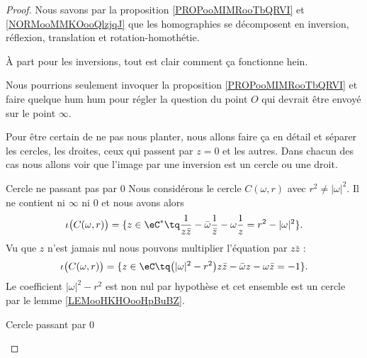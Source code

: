 \begin{proof}
    Nous savons par la proposition \ref{PROPooMIMRooTbQRVI} et \ref{NORMooMMKOooQlzjqJ} que les homographies se décomposent en inversion, réflexion, translation et rotation-homothétie.

    À part pour les inversions, tout est clair comment ça fonctionne hein. 

    Nous pourrions seulement invoquer la proposition \ref{PROPooMIMRooTbQRVI} et faire quelque hum hum pour régler la question du point \( O\) qui devrait être envoyé sur le point \( \infty\).

    Pour être certain de ne pas nous planter, nous allons faire ça en détail et séparer les cercles, les droites, ceux qui passent par \( z=0\) et les autres. Dans chacun des cas nous allons voir que l'image par une inversion est un cercle ou une droit.

    \begin{subproof}
        \item[Cercle ne passant pas par \( 0\)]
            Nous considérons le cercle \( C(\omega,r)\) avec \( r^2\neq | \omega |^2\). Il ne contient ni \( \infty\) ni \( 0\) et nous avons alors
            \begin{equation}
                \iota\big( C(\omega,r) \big)=\{ z\in \eC^*\tq \frac{1}{ z\bar z }-\bar\omega\frac{1}{ \bar z }-\omega\frac{1}{ z }=r^2-| \omega |^2 \}.
            \end{equation}
            Vu que \( z\) n'est jamais nul nous pouvons multiplier l'équation par \( z\bar z\) :
            \begin{equation}
                \iota\big( C(\omega,r) \big)=\{ z\in \eC\tq \big( | \omega |^2-r^2 \big)z\bar z-\bar\omega z-\omega\bar z=-1 \}.
            \end{equation}
            Le coefficient \( | \omega |^2-r^2\) est non nul par hypothèse et cet ensemble est un cercle par le lemme \ref{LEMooHKHOooHpBuBZ}.

        \item[Cercle passant par \( 0\)]


\end{subproof}
\end{proof}
